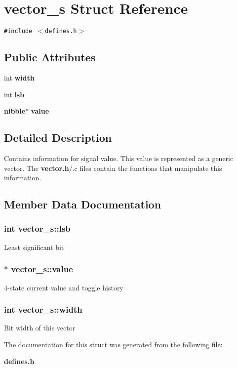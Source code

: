 \section{vector\_\-s  Struct Reference}
\label{structvector__s}
{\tt \#include $<$defines.h$>$}

\subsection*{Public Attributes}
\begin{CompactItemize}
\item 
int {\bf width}
\item 
int {\bf lsb}
\item 
{\bf nibble}$\ast$ {\bf value}
\end{CompactItemize}


\subsection{Detailed Description}
Contains information for signal value. This value is represented as a generic vector. The {\bf vector.h}/.c files contain the functions that manipulate this information. 



\subsection{Member Data Documentation}
\subsubsection{\setlength{\rightskip}{0pt plus 5cm}int vector\_\-s::lsb}\label{structvector__s_m1}


Least significant bit 
\subsubsection{ $\ast$ vector\_\-s::value}\label{structvector__s_m2}


4-state current value and toggle history 
\subsubsection{\setlength{\rightskip}{0pt plus 5cm}int vector\_\-s::width}\label{structvector__s_m0}


Bit width of this vector 

The documentation for this struct was generated from the following file:\begin{CompactItemize}
\item 
{\bf defines.h}\end{CompactItemize}
